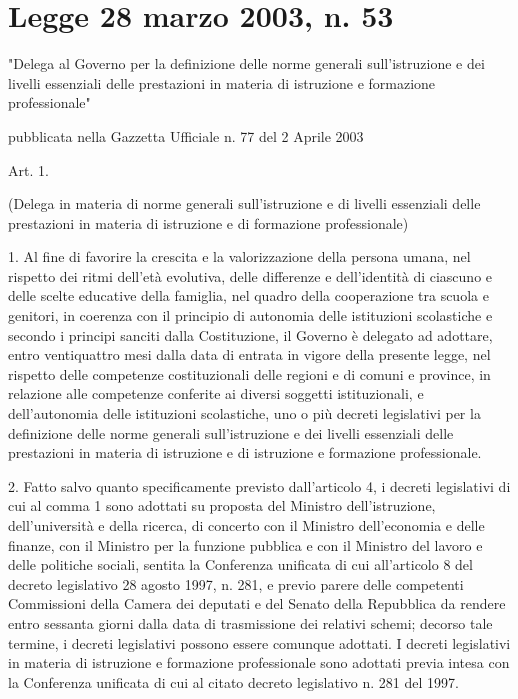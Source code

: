 \chapter{Legge 28 marzo 2003, n. 53}
\label{Legge2003_53}


"Delega al Governo per la definizione delle norme generali sull'istruzione e dei livelli essenziali delle prestazioni in materia di istruzione e formazione professionale"

pubblicata nella Gazzetta Ufficiale n. 77 del 2 Aprile 2003

Art. 1.

(Delega in materia di norme generali sull'istruzione e di livelli essenziali delle prestazioni in materia di istruzione e di formazione professionale)

1. Al fine di favorire la crescita e la valorizzazione della persona umana, nel rispetto dei ritmi dell'età evolutiva, delle differenze e dell'identità di ciascuno e delle scelte educative della famiglia, nel quadro della cooperazione tra scuola e genitori, in coerenza con il principio di autonomia delle istituzioni scolastiche e secondo i principi sanciti dalla Costituzione, il Governo è delegato ad adottare, entro ventiquattro mesi dalla data di entrata in vigore della presente legge, nel rispetto delle competenze costituzionali delle regioni e di comuni e province, in relazione alle competenze conferite ai diversi soggetti istituzionali, e dell'autonomia delle istituzioni scolastiche, uno o più decreti legislativi per la definizione delle norme generali sull'istruzione e dei livelli essenziali delle prestazioni in materia di istruzione e di istruzione e formazione professionale.

2. Fatto salvo quanto specificamente previsto dall'articolo 4, i decreti legislativi di cui al comma 1 sono adottati su proposta del Ministro dell'istruzione, dell'università e della ricerca, di concerto con il Ministro dell'economia e delle finanze, con il Ministro per la funzione pubblica e con il Ministro del lavoro e delle politiche sociali, sentita la Conferenza unificata di cui all'articolo 8 del decreto legislativo 28 agosto 1997, n. 281, e previo parere delle competenti Commissioni della Camera dei deputati e del Senato della Repubblica da rendere entro sessanta giorni dalla data di trasmissione dei relativi schemi; decorso tale termine, i decreti legislativi possono essere comunque adottati. I decreti legislativi in materia di istruzione e formazione professionale sono adottati previa intesa con la Conferenza unificata di cui al citato decreto legislativo n. 281 del 1997.

